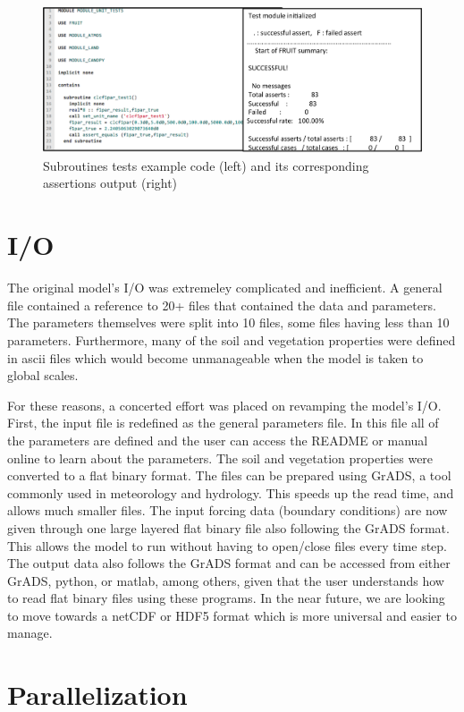 \documentclass[pdftex,12pt,a4paper]{article}
\begin{document}
\begin{figure}[h]
	\centering
	\includegraphics[width=5.5in]{Figures/Tests2.png}
	\caption{Subroutines tests example code (left) and its corresponding assertions output (right)}
	\label{Tests1}
\end{figure}

\section{I/O}

The original model's I/O was extremeley complicated and inefficient. A general file contained a reference to 20+ files that contained the data and parameters. The parameters themselves were split into 10 files, some files having less than 10 parameters. Furthermore, many of the soil and vegetation properties were defined in ascii files which would become unmanageable when the model is taken to global scales. 

For these reasons, a concerted effort was placed on revamping the model's I/O. First, the input file is redefined as the general parameters file. In this file all of the parameters are defined and the user can access the README or manual online to learn about the parameters. The soil and vegetation properties were converted to a flat binary format. The files can be prepared using GrADS, a tool commonly used in meteorology and hydrology. This speeds up the read time, and allows much smaller files. The input forcing data (boundary conditions) are now given through one large layered flat binary file also following the GrADS format. This allows the model to run without having to open/close files every time step. The output data also follows the GrADS format and can be accessed from either GrADS, python, or matlab, among others, given that the user understands how to read flat binary files using these programs. In the near future, we are looking to move towards a netCDF or HDF5 format which is more universal and easier to manage.

\section{Parallelization}
\end{document}
